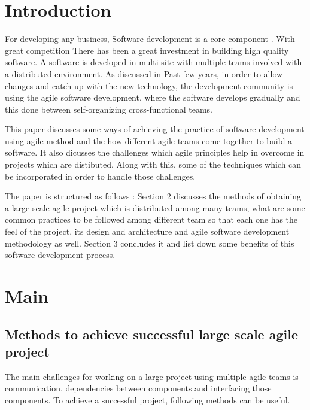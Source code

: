 \documentclass[sigconf]{acmart}
\begin{document}
\section{Introduction}
For developing any business, Software development is a core component \cite{HenrikK}. With great competition There has been a great investment in building high quality software. A software is developed in multi-site with multiple teams involved with a distributed environment. As discussed in \cite{4638656}Past few years, in order to allow changes and catch up with the new technology, the development community is using the agile software development, where the software develops gradually and this done between self-organizing cross-functional teams. 

This paper discusses some ways of achieving the practice of software development using agile method and the how different agile teams come together to build a software. It also dicusses the challenges which agile principles help in overcome in projects which are distibuted. Along with this, some of the techniques which can be incorporated in order to handle those challenges.

The paper is structured as follows : Section 2 discusses the methods of obtaining a large scale agile project which is distributed among many teams, what are some common practices to be followed among different team so that each one has the feel of the project, its design and architecture and agile software development methodology as well. Section 3 concludes it and list down some benefits of this software development process.


\section{Main}
\subsection{Methods to achieve successful large scale agile project}
The main challenges for working on a large project using multiple agile teams is communication, dependencies between components and interfacing those components. To achieve a successful project, following methods can be useful. 
\end{document}
